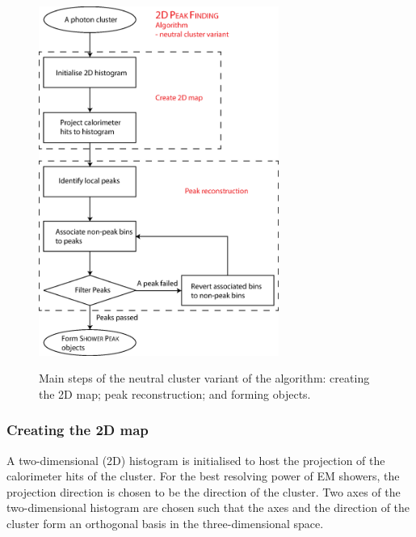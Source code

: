 \begin{figure}[tbph]
\centering
{\includegraphics[width=0.7\textwidth]{photon/2DpeakFinding3}}
\caption[Flow chart for \peakFinding algorithm neutral cluster variant.]
{Main steps of the  neutral cluster variant of the \peakFinding algorithm: creating the 2D map; peak reconstruction; and forming \ShowerPeak objects.}
\label{fig:photonPeakFindingFlowNeutral}
\end{figure}

\subsubsection{Creating the 2D map}

A two-dimensional (2D) histogram is initialised to host the projection of the calorimeter hits of the cluster. For the best resolving power of EM showers, the projection direction is chosen to be the direction of the cluster. Two axes of the two-dimensional histogram are chosen such that the axes and the direction of the cluster form an orthogonal basis  in the three-dimensional space.





